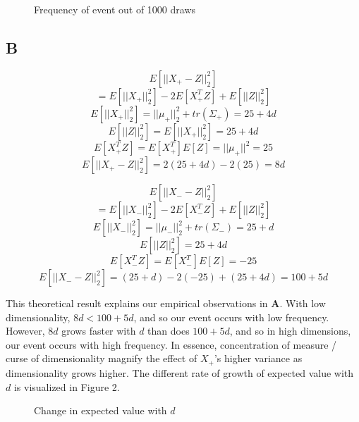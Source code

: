 \documentclass{report}
\begin{document}
\begin{figure}[h!]
	\centering
	\caption{Frequency of event out of 1000 draws}
\end{figure}

\subsection*{B}

$$ E[||X_+ - Z||^2_2] $$
$$ = E[||X_+||_2^2] -2E[X_+^TZ] + E[||Z||^2_2] $$
$$ E[||X_+||^2_2] = ||\mu_+||^2_2 + tr(\Sigma_+) = 25 + 4d$$
$$ E[||Z||^2_2] = E[||X_+||^2_2] = 25 + 4d$$
$$
E[X_+^TZ] = E[X_+^T]E[Z] = ||\mu_+||^2 = 25
$$
$$
E[||X_+ - Z||^2_2] = 2(25+4d) - 2(25) = \boxed{8d}
$$

\medskip

$$ E[||X_- - Z||^2_2] $$
$$ = E[||X_-||_2^2] -2E[X_-^TZ] + E[||Z||^2_2] $$
$$ E[||X_-||^2_2] = ||\mu_-||^2_2 + tr(\Sigma_-) = 25 + d$$
$$ E[||Z||^2_2] = 25 + 4d$$
$$ E[X_-^TZ] = E[X_-^T]E[Z] = -25$$
$$E[||X_- - Z||^2_2] = (25+d) - 2(-25) + (25+4d) = \boxed{100+5d}$$

\medskip

This theoretical result explains our empirical observations in \textbf{A}. With
low dimensionality, $8d < 100 + 5d$, and so our event occurs with low frequency.
However, $8d$ grows faster with $d$ than does $100 + 5d$, and so in
high dimensions, our event occurs with high frequency. In essence,
concentration of measure / curse of
dimensionality magnify the effect of $X_+$'s higher variance as dimensionality
grows higher. The different rate of
growth of expected value with $d$ is visualized in Figure 2.

\begin{figure}[h!]
	\centering
	\caption{Change in expected value with $d$}
\end{figure}
\end{document}
